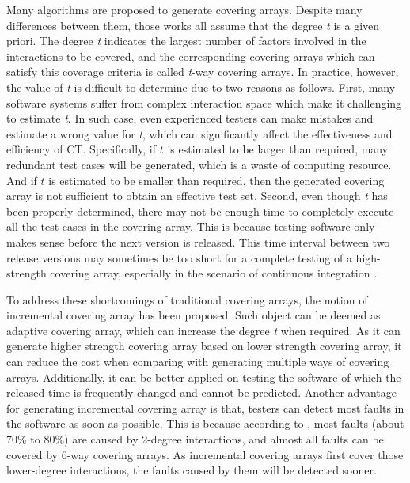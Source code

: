 \documentclass[conference]{IEEEtran}
\theoremstyle{definition}
\begin{document}
Many algorithms are proposed to generate covering arrays. Despite many differences between them,  those works all assume that the degree \emph{t} is a given priori.  The degree \emph{t} indicates the largest number of factors involved in the interactions to be covered, and the corresponding covering arrays which can satisfy this coverage criteria is called \emph{t}-way covering arrays. In practice, however, the value of \emph{t} is difficult to determine due to two reasons as follows. First, many software systems suffer from complex interaction space which make it challenging to estimate \emph{t}. In such case, even experienced testers can make mistakes and estimate a wrong value for \emph{t}, which can significantly affect the effectiveness and efficiency of CT. Specifically, if $t$ is estimated to be larger than required, many redundant test cases will be generated, which is a waste of computing resource. And if $t$ is estimated to be smaller than required, then the generated covering array is not sufficient to obtain an effective test set. Second, even though \emph{t} has been properly determined, there may not be enough time to completely execute all the test cases in the covering array. This is because testing software only makes sense before the next version is released. This time interval between two release versions may sometimes be too short for a complete testing of a high-strength covering array, especially in the scenario of continuous integration \cite{fouche2009incremental}.


To address these shortcomings of traditional covering arrays, the notion of incremental covering array \cite{fouche2009incremental} has been proposed. Such object can be deemed as adaptive covering array, which can increase the degree \emph{t} when required. As it can generate higher strength covering array based on lower strength covering array, it can reduce the cost when comparing with generating multiple ways of covering arrays. Additionally, it can be better applied on testing the software of which the released time is  frequently changed and cannot be predicted. Another advantage for generating incremental covering array is that, testers can detect most faults in the software as soon as possible. This is because according to \cite{kuhn2002investigation}, most faults (about 70\% to 80\%) are caused by 2-degree interactions, and almost all faults can be covered by 6-way covering arrays. As incremental covering arrays first cover those lower-degree interactions, the faults caused by them will be detected sooner.
\end{document}
